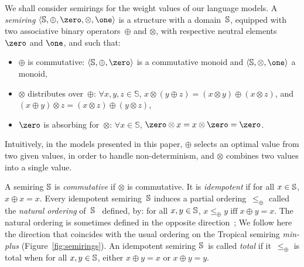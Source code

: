 %
%
We shall consider semirings for the weight values of our language models.
A \emph{semiring} $\< \Semiring, \oplus, \zero, \otimes, \one>$
is a structure with a domain~$\mathbb{S}$,
equipped with two associative
binary operators~$\oplus$ and $\otimes$,
with respective neutral elements $\zero$ and $\one$, and such that:
\begin{itemize}
\item $\oplus$ is commutative:
 $\< \Semiring, \oplus, \zero>$ is a commutative monoid
   and $\< \Semiring, \otimes, \one>$ a monoid,
\item $\otimes$ distributes over~$\oplus$:  $\forall x, y, z \in \mathbb{S}$,
$x \otimes (y \oplus z) = (x \otimes y) \oplus (x \otimes z)$,
and $(x \oplus y) \otimes z = (x \otimes z) \oplus (y \otimes z)$,
\item $\zero$ is absorbing for~$\otimes$:
$\forall x\in \mathbb{S}$, $\zero \otimes x = x \otimes \zero = \zero$.
\end{itemize}
%
Intuitively, in the models presented in this paper,
$\oplus$ selects an optimal value from two given values,
in order to handle non-determinism,
and $\otimes$ combines two values into a single value.

\medskip%
A semiring $\mathbb{S}$ is \emph{commutative} if $\otimes$ is commutative.
It is \emph{idempotent} if for all $x \in \mathbb{S}$, $x \oplus x = x$.
%
Every idempotent semiring~$\mathbb{S}$ induces
a partial ordering~$\leq_\oplus$
called the \emph{natural ordering} of~$\mathbb{S}$~\cite{Mohri02semiring}
defined,  by:
for all $x, y\in \mathbb{S}$,
$x \leq_\oplus y \;\mbox{iff}\; x \oplus y = x$.
%
The natural ordering is sometimes defined in the opposite direction~\cite{DrosteKuich09semirings};
We follow here the direction  %
that coincides with the usual ordering on the Tropical semiring \emph{min-plus}
(Figure~\ref{fig:semirings}).
%
\noindent
An idempotent semiring $\mathbb{S}$~is called \emph{total} if
it~$\leq_\oplus$ is total
\ie when for all $x, y \in \mathbb{S}$, either $x \oplus y = x$ or $x \oplus y = y$.

